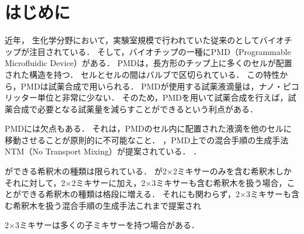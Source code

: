 \chapter{はじめに}
近年， 生化学分野において，実験室規模で行われていた従来のとしてバイオチップが注目されている．
そして，バイオチップの一種にPMD（Programmable Microfluidic Device）がある\cite{PMDDescription}．
PMDは，長方形のチップ上に多くのセルが配置された構造を持つ．
セルとセルの間はバルブで区切られている．
この特性から，PMDは試薬合成で用いられる\cite{C0LC00537A}．
PMDが使用する試薬液滴量は，ナノ・ピコリッター単位と非常に少ない．
そのため，PMDを用いて試薬合成を行えば，試薬合成で必要となる試薬量を減らすことができるという利点がある\cite{PMDDescription}．

PMDには欠点もある．
それは，PMDのセル内に配置された液滴を他のセルに移動させることが原則的に不可能なこと\cite{9116370}．
，PMD上での混合手順の生成手法NTM（No Transport Mixing）が提案されている\cite{9116370}．
．

ができる希釈木の種類は限られている．
が2$\times$2ミキサーのみを含む希釈木しか
それに対して，2$\times$2ミキサーに加え，2$\times$3ミキサーも含む希釈木を扱う場合，ことができる希釈木の種類は格段に増える．
それにも関わらず，2$\times$3ミキサーも含む希釈木を扱う混合手順の生成手法これまで提案され

2$\times$3ミキサーは多くの子ミキサーを持つ場合がある．

